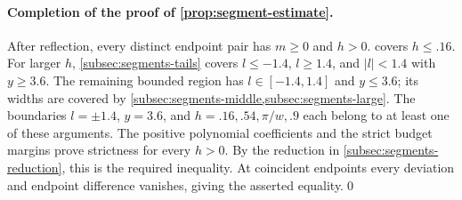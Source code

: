 \paragraph{Completion of the proof of \cref{prop:segment-estimate}.}
After reflection, every distinct endpoint pair has $m\ge0$ and $h>0$.  covers $h\le.16$. For larger $h$, \cref{subsec:segments-tails} covers $l\le-1.4$, $l\ge1.4$, and $|l|<1.4$ with $y\ge3.6$. The remaining bounded region has $l\in[-1.4,1.4]$ and $y\le3.6$; its widths are covered by \cref{subsec:segments-middle,subsec:segments-large}. The boundaries $l=\pm1.4$, $y=3.6$, and $h=.16,.54,\pi/w,.9$ each belong to at least one of these arguments. The positive polynomial coefficients and the strict budget margins prove strictness for every $h>0$. By the reduction in \cref{subsec:segments-reduction}, this is the required inequality. At coincident endpoints every deviation and endpoint difference vanishes, giving the asserted equality.\qed
